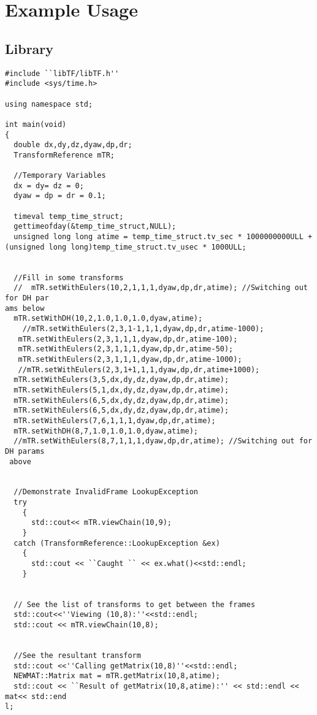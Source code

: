 \documentclass[12pt]{article}
\begin{document}
\section{Example Usage}
\subsection{Library}
\begin{verbatim}
#include ``libTF/libTF.h''
#include <sys/time.h>

using namespace std;

int main(void)
{
  double dx,dy,dz,dyaw,dp,dr;
  TransformReference mTR;
  
  //Temporary Variables
  dx = dy= dz = 0;
  dyaw = dp = dr = 0.1;
  
  timeval temp_time_struct;
  gettimeofday(&temp_time_struct,NULL);
  unsigned long long atime = temp_time_struct.tv_sec * 1000000000ULL + (unsigned long long)temp_time_struct.tv_usec * 1000ULL;

  
  //Fill in some transforms
  //  mTR.setWithEulers(10,2,1,1,1,dyaw,dp,dr,atime); //Switching out for DH par
ams below
  mTR.setWithDH(10,2,1.0,1.0,1.0,dyaw,atime);
    //mTR.setWithEulers(2,3,1-1,1,1,dyaw,dp,dr,atime-1000);
   mTR.setWithEulers(2,3,1,1,1,dyaw,dp,dr,atime-100);
   mTR.setWithEulers(2,3,1,1,1,dyaw,dp,dr,atime-50);
   mTR.setWithEulers(2,3,1,1,1,dyaw,dp,dr,atime-1000);
   //mTR.setWithEulers(2,3,1+1,1,1,dyaw,dp,dr,atime+1000);
  mTR.setWithEulers(3,5,dx,dy,dz,dyaw,dp,dr,atime);
  mTR.setWithEulers(5,1,dx,dy,dz,dyaw,dp,dr,atime);
  mTR.setWithEulers(6,5,dx,dy,dz,dyaw,dp,dr,atime);
  mTR.setWithEulers(6,5,dx,dy,dz,dyaw,dp,dr,atime);
  mTR.setWithEulers(7,6,1,1,1,dyaw,dp,dr,atime);
  mTR.setWithDH(8,7,1.0,1.0,1.0,dyaw,atime);
  //mTR.setWithEulers(8,7,1,1,1,dyaw,dp,dr,atime); //Switching out for DH params
 above
  
  
  //Demonstrate InvalidFrame LookupException
  try
    {
      std::cout<< mTR.viewChain(10,9);
    }
  catch (TransformReference::LookupException &ex)
    {
      std::cout << ``Caught `` << ex.what()<<std::endl;
    }
  
  
  // See the list of transforms to get between the frames
  std::cout<<''Viewing (10,8):''<<std::endl;  
  std::cout << mTR.viewChain(10,8);
  
  
  //See the resultant transform
  std::cout <<''Calling getMatrix(10,8)''<<std::endl;
  NEWMAT::Matrix mat = mTR.getMatrix(10,8,atime);  
  std::cout << ``Result of getMatrix(10,8,atime):'' << std::endl << mat<< std::end
l;
  

\end{verbatim}
\end{document}
